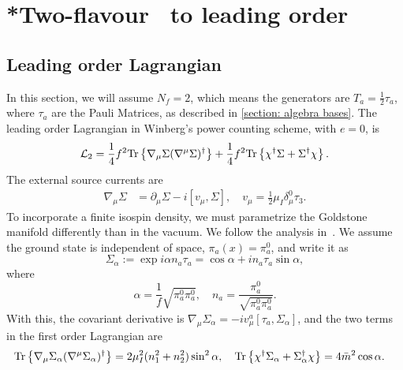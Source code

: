 \section{*Two-flavour \chpt\ to leading order}
\label{section: two-flavor chpt to leading order}


\subsection{Leading order Lagrangian}
\label{section: leading order}

In this section, we will assume $N_f = 2$, which means the generators are $T_a = \frac{1}{2} \tau_a$, where $\tau_a$ are the Pauli Matrices, as described in \autoref{section: algebra bases}.
The leading order Lagrangian in Winberg's power counting scheme, with $e = 0$, is
%
\begin{equation}
    \label{leading order two-flavor chpt Lagrangian}
    \mathcal{L}_2 = 
    \frac{1}{4} f^2 \text{Tr} \left\{ \nabla_\mu \Sigma (\nabla^\mu \Sigma)^\dagger \right\}
    + \frac{1}{4} f^2 \text{Tr} \left\{ \chi^\dagger \Sigma + \Sigma^\dagger \chi \right\}.
\end{equation}
%
The external source currents are
\begin{align}
    \nabla_\mu \Sigma &= \partial_\mu \Sigma - i [v_\mu, \Sigma],
    \quad v_\mu = \frac{1}{2} \mu_I \delta_\mu^0 \tau_3.
\end{align}
To incorporate a finite isospin density, we must parametrize the Goldstone manifold differently than in the vacuum.
We follow the analysis in~\autocite{adhikariTwoflavorChiralPerturbation2019}.
We assume the ground state is independent of space, $\pi_a(x) = \pi_a^0$, and write it as
\begin{equation}
    \Sigma_\alpha 
    :=
    \exp{i \alpha n_a \tau_a}
    = 
    \cos \alpha + i n_a \tau_a \sin \alpha,
\end{equation}
%
where
\begin{equation}
    \alpha = \frac{1}{f} \sqrt{\pi^0_a \pi^0_a}, \quad
    n_a = \frac{\pi^0_a}{\sqrt{\pi^0_a \pi^0_a}}.
\end{equation}
%
With this, the covariant derivative is $\nabla_\mu \Sigma_\alpha = - iv^a_\mu [\tau_a, \Sigma_\alpha]$, and the two terms in the first order Lagrangian are
\begin{align}
    \text{Tr} \left\{ \nabla_\mu \Sigma_\alpha  (\nabla^\mu \Sigma_\alpha)^\dagger \right\}
    & = 2 \mu_I^2 (n_1^2 + n_2^2) \sin^2 \alpha, \quad
    \text{Tr} \left\{ \chi^\dagger \Sigma_\alpha + \Sigma_\alpha^\dagger \chi \right\}
    = 4 \bar m^2 \cos \alpha.
\end{align}
